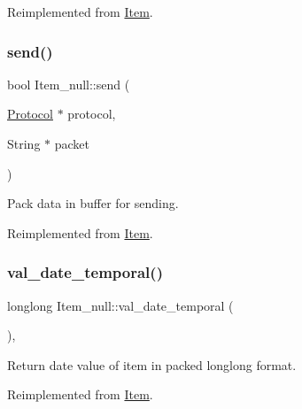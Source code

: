 Reimplemented from \mbox{\hyperlink{classItem}{Item}}.

\mbox{\label{classItem__null_abda34e2df5b301b98193bf38b0766f15}} 
\subsubsection{\texorpdfstring{send()}{send()}}
{\footnotesize\ttfamily bool Item\+\_\+null\+::send (\begin{DoxyParamCaption}\item[{\mbox{\hyperlink{classProtocol}{Protocol}} $\ast$}]{protocol,  }\item[{String $\ast$}]{packet }\end{DoxyParamCaption})\hspace{0.3cm}{\ttfamily [virtual]}}

Pack data in buffer for sending. 

Reimplemented from \mbox{\hyperlink{classItem_a7d1b934e9612e1c78bd369b31e3d9cb1}{Item}}.

\mbox{\label{classItem__null_a99590d9cddd9f8fbc0a6bfbc848325e9}} 
\subsubsection{\texorpdfstring{val\+\_\+date\+\_\+temporal()}{val\_date\_temporal()}}
{\footnotesize\ttfamily longlong Item\+\_\+null\+::val\+\_\+date\+\_\+temporal (\begin{DoxyParamCaption}{ }\end{DoxyParamCaption})\hspace{0.3cm}{\ttfamily [inline]}, {\ttfamily [virtual]}}

Return date value of item in packed longlong format. 

Reimplemented from \mbox{\hyperlink{classItem_a9174217a46706eb2db74689b5365c4a5}{Item}}.

\mbox{\label{classItem__null_a251248ba4bdd1ac6628c60db7c3aaa01}} 
